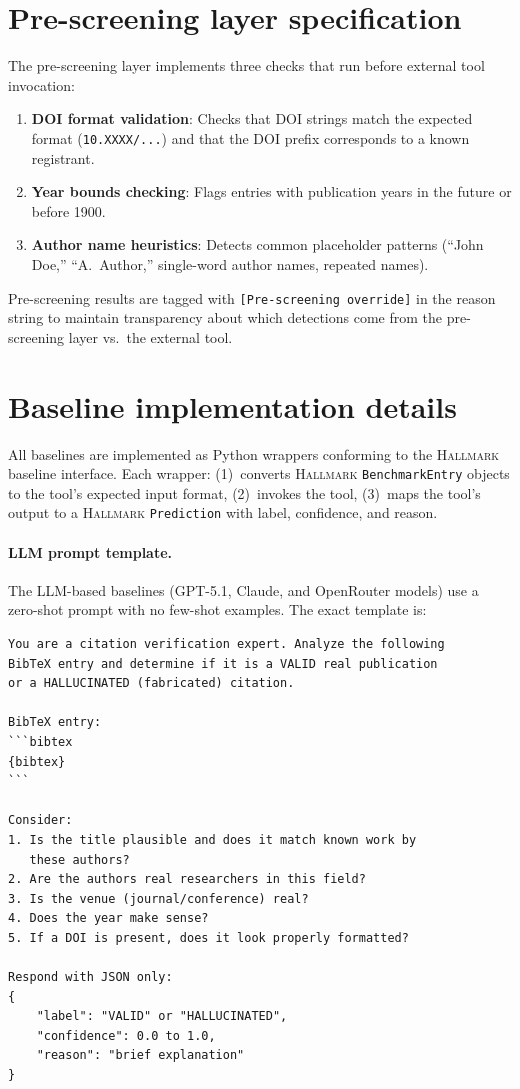 \section{Pre-screening layer specification}
\label{app:prescreening}

The pre-screening layer implements three checks that run before external tool invocation:

\begin{enumerate}
    \item \textbf{DOI format validation}: Checks that DOI strings match the expected format (\texttt{10.XXXX/...}) and that the DOI prefix corresponds to a known registrant.
    \item \textbf{Year bounds checking}: Flags entries with publication years in the future or before 1900.
    \item \textbf{Author name heuristics}: Detects common placeholder patterns (``John Doe,'' ``A.\ Author,'' single-word author names, repeated names).
\end{enumerate}

Pre-screening results are tagged with \texttt{[Pre-screening override]} in the reason string to maintain transparency about which detections come from the pre-screening layer vs.\ the external tool.

\section{Baseline implementation details}
\label{app:baselines}

All baselines are implemented as Python wrappers conforming to the \textsc{Hallmark} baseline interface.
Each wrapper:
(1)~converts \textsc{Hallmark} \texttt{BenchmarkEntry} objects to the tool's expected input format,
(2)~invokes the tool,
(3)~maps the tool's output to a \textsc{Hallmark} \texttt{Prediction} with label, confidence, and reason.

\paragraph{LLM prompt template.}
\label{app:prompt-template}
The LLM-based baselines (GPT-5.1, Claude, and OpenRouter models) use a zero-shot prompt with no few-shot examples.
The exact template is:

\begin{lstlisting}[basicstyle=\small\ttfamily, breaklines=true, frame=single, captionpos=b]
You are a citation verification expert. Analyze the following
BibTeX entry and determine if it is a VALID real publication
or a HALLUCINATED (fabricated) citation.

BibTeX entry:
```bibtex
{bibtex}
```

Consider:
1. Is the title plausible and does it match known work by
   these authors?
2. Are the authors real researchers in this field?
3. Is the venue (journal/conference) real?
4. Does the year make sense?
5. If a DOI is present, does it look properly formatted?

Respond with JSON only:
{
    "label": "VALID" or "HALLUCINATED",
    "confidence": 0.0 to 1.0,
    "reason": "brief explanation"
}
\end{lstlisting}

